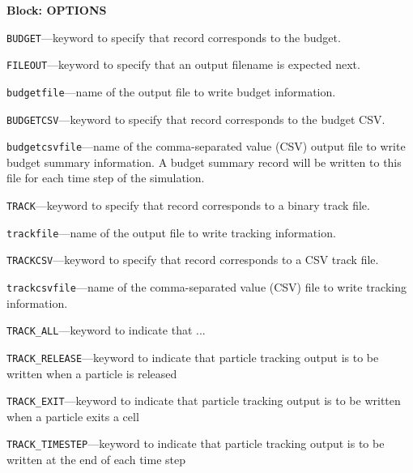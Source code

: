 
\item \textbf{Block: OPTIONS}

\begin{description}
\item \texttt{BUDGET}---keyword to specify that record corresponds to the budget.

\item \texttt{FILEOUT}---keyword to specify that an output filename is expected next.

\item \texttt{budgetfile}---name of the output file to write budget information.

\item \texttt{BUDGETCSV}---keyword to specify that record corresponds to the budget CSV.

\item \texttt{budgetcsvfile}---name of the comma-separated value (CSV) output file to write budget summary information.  A budget summary record will be written to this file for each time step of the simulation.

\item \texttt{TRACK}---keyword to specify that record corresponds to a binary track file.

\item \texttt{trackfile}---name of the output file to write tracking information.

\item \texttt{TRACKCSV}---keyword to specify that record corresponds to a CSV track file.

\item \texttt{trackcsvfile}---name of the comma-separated value (CSV) file to write tracking information.

\item \texttt{TRACK\_ALL}---keyword to indicate that ...

\item \texttt{TRACK\_RELEASE}---keyword to indicate that particle tracking output is to be written when a particle is released

\item \texttt{TRACK\_EXIT}---keyword to indicate that particle tracking output is to be written when a particle exits a cell

\item \texttt{TRACK\_TIMESTEP}---keyword to indicate that particle tracking output is to be written at the end of each time step


\end{description}
